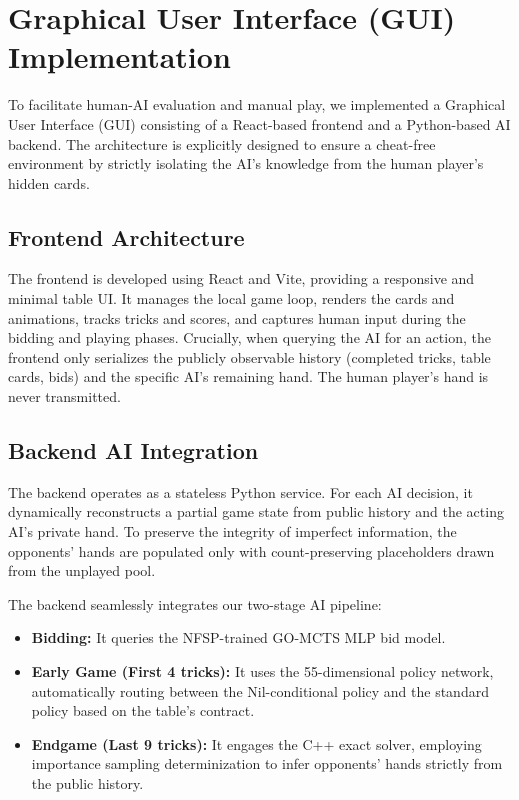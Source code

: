 \documentclass{article}
\begin{document}
\section{Graphical User Interface (GUI) Implementation}
\label{app:gui}

To facilitate human-AI evaluation and manual play, we implemented a Graphical User Interface (GUI) consisting of a React-based frontend and a Python-based AI backend. The architecture is explicitly designed to ensure a cheat-free environment by strictly isolating the AI's knowledge from the human player's hidden cards.

\subsection{Frontend Architecture}
The frontend is developed using React and Vite, providing a responsive and minimal table UI. It manages the local game loop, renders the cards and animations, tracks tricks and scores, and captures human input during the bidding and playing phases. Crucially, when querying the AI for an action, the frontend only serializes the publicly observable history (completed tricks, table cards, bids) and the specific AI's remaining hand. The human player's hand is never transmitted.

\subsection{Backend AI Integration}
The backend operates as a stateless Python service. For each AI decision, it dynamically reconstructs a partial game state from public history and the acting AI's private hand. To preserve the integrity of imperfect information, the opponents' hands are populated only with count-preserving placeholders drawn from the unplayed pool.

The backend seamlessly integrates our two-stage AI pipeline:
\begin{itemize}
    \item \textbf{Bidding:} It queries the NFSP-trained GO-MCTS MLP bid model.
    \item \textbf{Early Game (First 4 tricks):} It uses the 55-dimensional policy network, automatically routing between the Nil-conditional policy and the standard policy based on the table's contract.
    \item \textbf{Endgame (Last 9 tricks):} It engages the C++ exact solver, employing importance sampling determinization to infer opponents' hands strictly from the public history.
\end{itemize}
\end{document}
